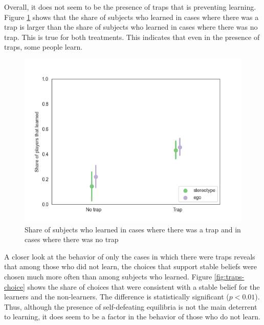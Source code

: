 \documentclass[
  12pt,
]{article}
\begin{document}
Overall, it does not seem to be the presence of traps that is preventing
learning. Figure \ref{fig:traps} shows that the share of subjects who
learned in cases where there was a trap is larger than the share of
subjects who learned in cases where there was no trap. This is true for
both treatments. This indicates that even in the presence of traps, some
people learn.

\begin{figure}
\hypertarget{fig:traps}{%
\centering
\includegraphics{../figures/learning_trap_presence.png}
\caption{Share of subjects who learned in cases where there was a trap
and in cases where there was no trap}\label{fig:traps}
}
\end{figure}

A closer look at the behavior of only the cases in which there were
traps reveals that among those who did not learn, the choices that
support stable beliefs were chosen much more often than among subjects
who learned. Figure \ref{fig:traps-choice} shows the share of choices
that were consistent with a stable belief for the learners and the
non-learners. The difference is statistically significant (\(p<0.01\)).
Thus, although the presence of self-defeating equilibria is not the main
deterrent to learning, it does seem to be a factor in the behavior of
those who do not learn.
\end{document}
